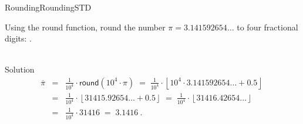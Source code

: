 \begin{MXContent}{Rounding}{Rounding}{STD}
\begin{MExercise}
Using the \textsf{round} function, round the number $\pi=3.141592654\ldots$ to four fractional digits:
.
\ \\ \ \\
\begin{MHint}{Solution}
\begin{eqnarray*}
\overline{\pi} & = & \frac{1}{10^{4}}\cdot \mathsf{round}(10^{4}\cdot \pi)\; =\; \frac{1}{10^{4}}\cdot \left\lfloor{ 10^{4}\cdot 3.141592654\ldots + 0.5 }\right\rfloor \ \\
& = & \frac{1}{10^{4}}\cdot \left\lfloor{ 31415.92654\ldots+0.5}\right\rfloor \;=\; \frac{1}{10^{4}}\cdot \left\lfloor{ 31416.42654\ldots }\right\rfloor\ \\
& = & \frac{1}{10^{4}}\cdot 31416\; =\;  3.1416\: .
\end{eqnarray*}
\end{MHint}
\end{MExercise}



\end{MXContent}
